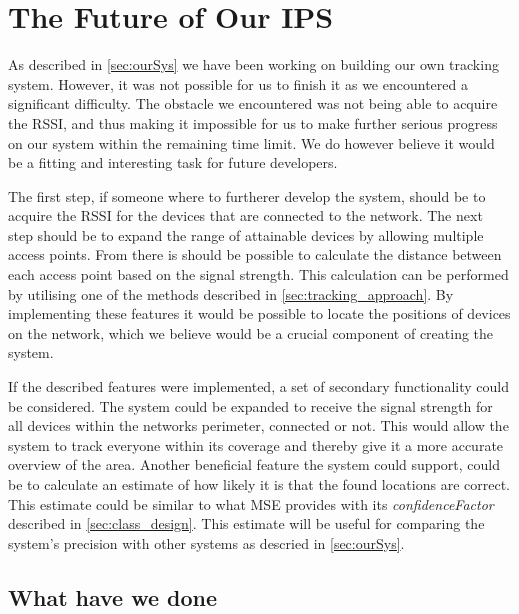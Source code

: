\section{The Future of Our IPS}\label{sec:futureSystem}
As described in \cref{sec:ourSys} we have been working on building our own tracking system. However, it was not possible for us to finish it as we encountered a significant difficulty. The obstacle we encountered was not being able to acquire the RSSI, and thus making it impossible for us to make further serious progress on our system within the remaining time limit. We do however believe it would be a fitting and interesting task for future developers.

The first step, if someone where to furtherer develop the system, should be to acquire the RSSI for the devices that are connected to the network. The next step should be to expand the range of attainable devices by allowing multiple access points. From there is should be possible to calculate the distance between each access point based on the signal strength. This calculation can be performed by utilising one of the methods described in \cref{sec:tracking_approach}. By implementing these features it would be possible to locate the positions of devices on the network, which we believe would be a crucial component of creating the system.

If the described features were implemented, a set of secondary functionality could be considered. The system could be expanded to receive the signal strength for all devices within the networks perimeter, connected or not. This would allow the system to track everyone within its coverage and thereby give it a more accurate overview of the area.
Another beneficial feature the system could support, could be to calculate an estimate of how likely it is that the found locations are correct. This estimate could be similar to what MSE provides with its \textit{confidenceFactor} described in \cref{sec:class_design}. This estimate will be useful for comparing the system's precision with other systems as descried in \cref{sec:ourSys}.

\subsection{What have we done} 